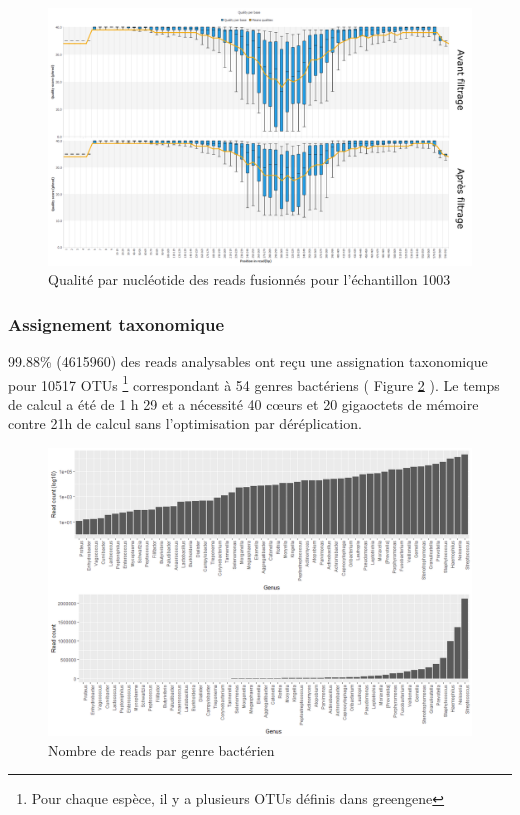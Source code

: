 \documentclass[12pt,a4paper]{article}
\begin{document}
\begin{figure}[h]
\begin{center}
\includegraphics[scale=0.45]{img/duo_merging.png}\hfill
\end{center}
\caption{Qualité par nucléotide des reads fusionnés pour l'échantillon 1003}
\label{fastqt_after}
\end{figure}


\subsubsection{Assignement taxonomique}
99.88\% (4615960) des reads analysables ont reçu une assignation taxonomique pour 10517 OTUs \footnote{Pour chaque espèce, il y a plusieurs OTUs définis dans greengene} correspondant à 54 genres bactériens ( Figure \ref{readgenus} ). 
Le temps de calcul a été de 1 h 29 et a nécessité 40 cœurs et 20 gigaoctets de mémoire contre 21h de calcul sans l’optimisation par déréplication.


\begin{figure}[h]
\begin{center}
\includegraphics[scale=0.5]{img/read_count_genus_all.png}\hfill
\end{center}
\caption{Nombre de reads par genre bactérien}
\label{readgenus}
\end{figure}
\end{document}
